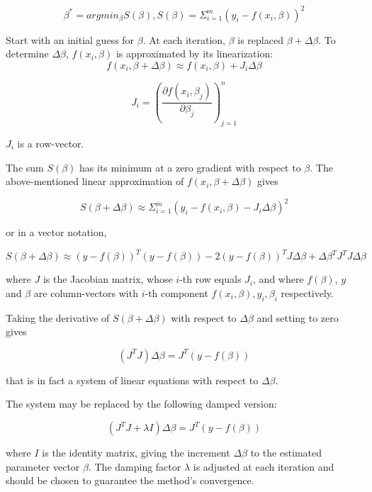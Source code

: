 \begin{equation*}
    \beta^{*} = arg min_{\beta} S(\beta), S(\beta) = \Sigma_{i=1}^m (y_i - f(x_i, \beta))^2
\end{equation*}

Start with an initial guess for $\beta$. At each iteration, $\beta$ is replaced  $\beta + \Delta \beta$. To determine $\Delta \beta$, $f(x_i, \beta)$ is approximated by its linearization:
\begin{equation*}
    f(x_i, \beta + \Delta \beta) \approx f(x_i, \beta) + J_i \Delta \beta
\end{equation*}

\begin{equation*}
    J_i = (\frac{\partial f(x_i, \beta_j)}{\partial \beta_j})_{j=1}^n
\end{equation*}

$J_i$ is a row-vector.

The sum $S(\beta)$ has its minimum at a zero gradient with respect to $\beta$. The above-mentioned linear approximation of $f(x_i, \beta + \Delta \beta)$ gives

\begin{equation*}
    S(\beta + \Delta \beta) \approx \Sigma_{i=1}^m (y_i - f(x_i, \beta) - J_i \Delta \beta)^2
\end{equation*}

or in a vector notation,

\begin{equation*}
    S(\beta + \Delta \beta) \approx (y - f(\beta))^T(y - f(\beta)) - 2(y - f(\beta))^TJ\Delta \beta + \Delta \beta^TJ^TJ\Delta\beta
\end{equation*}

where $J$ is the Jacobian matrix, whose $i$-th row equals $J_i$, and where $f(\beta)$, $y$ and $\beta$ are column-vectors with $i$-th component $f(x_i, \beta), y_i, \beta_i$ respectively.

Taking the derivative of $S(\beta + \Delta \beta)$ with respect to $\Delta \beta$ and setting to zero gives

\begin{equation*}
    (J^T J)\Delta \beta = J^T(y - f(\beta))
\end{equation*}

that is in fact a system of linear equations with respect to $\Delta \beta$.

The system may be replaced by the following damped version:

\begin{equation*}
    (J^T J + \lambda I)\Delta \beta = J^T(y - f(\beta))
\end{equation*}

where $I$ is the identity matrix, giving the increment $\Delta \beta$ to the estimated parameter vector $\beta$. The damping factor $\lambda$ is adjusted at each iteration and should be chosen to guarantee the method's convergence.